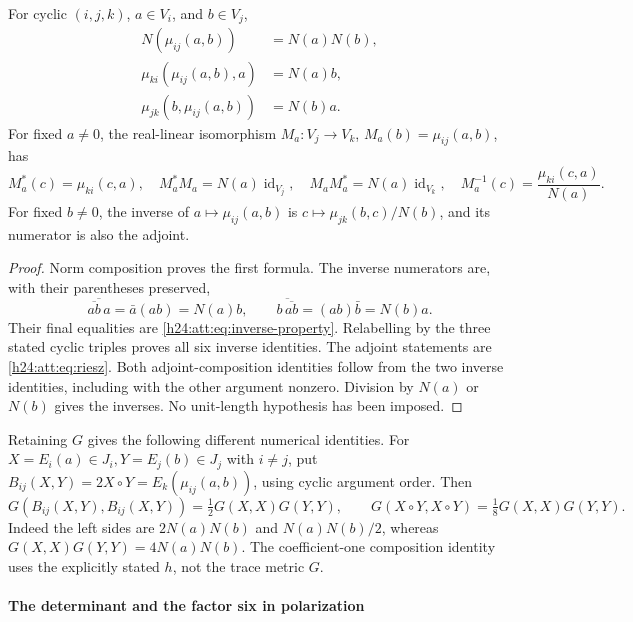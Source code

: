 \begin{proposition}\label{h24:att:prop:norm-inverse}
For cyclic $(i,j,k)$, $a\in V_i$, and $b\in V_j$,
\begin{align}
 N(\mu_{ij}(a,b))&=N(a)N(b),\label{h24:att:eq:composition}\\
 \mu_{ki}(\mu_{ij}(a,b),a)&=N(a)b,\label{h24:att:eq:inverse-one}\\
 \mu_{jk}(b,\mu_{ij}(a,b))&=N(b)a.\label{h24:att:eq:inverse-two}
\end{align}
For fixed $a\ne0$, the real-linear isomorphism
$M_a:V_j\to V_k$, $M_a(b)=\mu_{ij}(a,b)$, has
\[
 M_a^*(c)=\mu_{ki}(c,a),\quad
 M_a^*M_a=N(a)\operatorname{id}_{V_j},\quad
 M_aM_a^*=N(a)\operatorname{id}_{V_k},\quad
 M_a^{-1}(c)=\frac{\mu_{ki}(c,a)}{N(a)}.
\]
For fixed $b\ne0$, the inverse of $a\mapsto\mu_{ij}(a,b)$ is
$c\mapsto\mu_{jk}(b,c)/N(b)$, and its numerator is also the adjoint.
\end{proposition}

\begin{proof}
Norm composition proves the first formula. The inverse numerators are,
with their parentheses preserved,
\[
 \overline{\overline{ab}\,a}=\bar a(ab)=N(a)b,\qquad
 \overline{b\,\overline{ab}}=(ab)\bar b=N(b)a.
\]
Their final equalities are \eqref{h24:att:eq:inverse-property}. Relabelling
by the three stated cyclic triples proves all six inverse identities.
The adjoint statements are \eqref{h24:att:eq:riesz}. Both adjoint-composition
identities follow from the two inverse identities, including with the
other argument nonzero. Division by $N(a)$ or $N(b)$ gives the inverses.
No unit-length hypothesis has been imposed.
\end{proof}

Retaining $G$ gives the following different numerical identities.
For $X=E_i(a)\in J_i,Y=E_j(b)\in J_j$ with $i\ne j$, put
$B_{ij}(X,Y)=2X\circ Y=E_k(\mu_{ij}(a,b))$, using cyclic argument order.
Then
\begin{equation}
 G(B_{ij}(X,Y),B_{ij}(X,Y))=\tfrac12G(X,X)G(Y,Y),\qquad
 G(X\circ Y,X\circ Y)=\tfrac18G(X,X)G(Y,Y).
 \label{h24:att:eq:trace-norm-factors}
\end{equation}
Indeed the left sides are $2N(a)N(b)$ and $N(a)N(b)/2$,
whereas $G(X,X)G(Y,Y)=4N(a)N(b)$. The coefficient-one composition
identity uses the explicitly stated $h$, not the trace metric $G$.

\paragraph{The determinant and the factor six in polarization}

